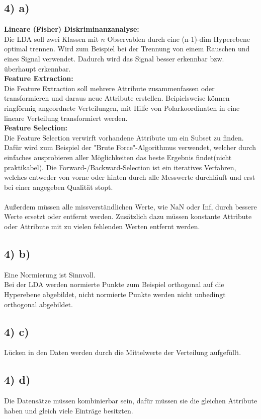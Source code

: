 \subsection*{4) a)}
\textbf{Lineare (Fisher) Diskriminanzanalyse:} \\
Die LDA soll zwei Klassen mit $n$ Observablen durch eine (n-1)-dim Hyperebene optimal trennen. Wird zum Beispiel bei der Trennung von einem Rauschen und eines Signal verwendet. Dadurch wird das Signal besser erkennbar bzw. überhaupt erkennbar. \\
\textbf{Feature Extraction:} \\
Die Feature Extraction soll mehrere Attribute zusammenfassen oder transformieren und daraus neue Attribute erstellen. Beipielsweise können ringförmig angeordnete Verteilungen, mit Hilfe von Polarkoordinaten in eine lineare Verteilung transformiert werden. \\
\textbf{Feature Selection:} \\
Die Feature Selection verwirft vorhandene Attribute um ein Subset zu finden. Dafür wird zum Beispiel der "Brute Force"-Algorithmus verwendet, welcher durch einfaches ausprobieren aller Möglichkeiten das beste Ergebnis findet(nicht praktikabel). Die Forward-/Backward-Selection ist ein iteratives Verfahren, welches entweder von vorne oder hinten durch alle Messwerte durchläuft und erst bei einer angegeben Qualität stopt. \\
\\
Außerdem müssen alle missverständlichen Werte, wie NaN oder Inf, durch bessere Werte ersetzt oder entfernt werden. Zusätzlich dazu müssen konstante Attribute oder Attribute mit zu vielen fehlenden Werten entfernt werden.



\subsection*{4) b)}
Eine Normierung ist Sinnvoll. \\
Bei der LDA werden normierte Punkte zum Beispiel orthogonal auf die Hyperebene abgebildet, nicht normierte Punkte werden nicht unbedingt orthogonal abgebildet.



\subsection*{4) c)}
Lücken in den Daten werden durch die Mittelwerte der Verteilung aufgefüllt.



\subsection*{4) d)}
Die Datensätze müssen kombinierbar sein, dafür müssen sie die gleichen Attribute haben und gleich viele Einträge besitzten.
